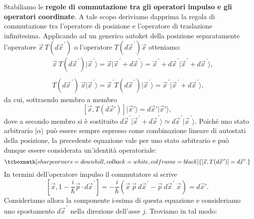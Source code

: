 \documentclass[a4paper,12pt,oneside]{book}
\begin{document}
Stabiliamo le \textbf{regole di commutazione tra gli operatori impulso e gli operatori coordinate}. A tale scopo deriviamo dapprima la regola di commutazione tra l'operatore di posizione e l'operatore di traslazione infinitesima. Applicando ad un generico autoket della posizione separatamente l'operatore $\vec{x}\ T(d{\vec{x}}^{\, \prime})$ o l'operatore $T(d{\vec{x}}^{\, \prime})\vec{x}$ otteniamo:
	\begin{eqnarray}
		& & \vec{x}\ T(d{\vec{x}}^{\, \prime})\vert {\vec{x}}^{\, \prime} \rangle = \vec{x}\vert{\vec{x}}^{\, \prime}+d{\vec{x}}^{\, \prime}\rangle ={\vec{x}}^{\, \prime}+d{\vec{x}}^{\, \prime}\vert{\vec{x}}^{\, \prime}+d{\vec{x}}^{\, \prime}\rangle ,  \\
 \nonumber \\
		& & T(d{\vec{x}}^{\, \prime})\ \vec{x} \vert {\vec{x}}^{\, \prime} \rangle = {\vec{x}}^{\, \prime} T(d{\vec{x}}^{\, \prime})\vert {\vec{x}}^{\, \prime}\rangle = {\vec{x}}^{\, \prime}\vert {\vec{x}}^{\, \prime}+d{\vec{x}}^{\, \prime}\rangle ,
	\end{eqnarray}
da cui, sottraendo membro a membro
	\begin{equation}
		\left[\vec{x}, T(d\vec{x}')\right]\vert \vec{x}' \rangle = d\vec{x}' \vert \vec{x}' \rangle ,
	\end{equation}
dove a secondo membro si è sostituito $d{\vec{x}}^{\, \prime} \vert {\vec{x}}^{\, \prime}+d{\vec{x}}^{\, \prime}\rangle \simeq d{\vec{x}}^{\, \prime} \vert {\vec{x}}^{\, \prime}\rangle$. Poiché uno stato arbitrario $\vert \alpha \rangle $ può essere sempre espresso come combinazione lineare di autostati della posizione, la precedente equazione vale per uno stato arbitrario e può dunque essere considerata un'identità operatoriale:
	\begin{equation}
		\tcboxmath[sharp corners=downhill, colback=white, colframe=black]{	
			\left[\vec{x}, T(d{\vec{x}}^{\, \prime})\right] = d{\vec{x}}^{\, \prime} .
			}
	\end{equation}
In termini dell'operatore impulso il commutatore si scrive
	\begin{equation}
		\left[ \vec{x}, 1- \frac{i}{\hbar}\vec{p}\cdot d{\vec{x}}^{\, \prime}\right] =-\frac{i}{\hbar}\left(\vec{x}\ \vec{p}\ d{\vec{x}}^{\, \prime}-\vec{p}\ d{\vec{x}}^{\, \prime}\ \vec{x} \right) =d\vec{x}' .
	\end{equation}
Consideriamo allora la componente i-esima di questa equazione e consideriamo uno spostamento $d{\vec{x}}^{\, \prime}$ nella direzione dell'asse $j$. Troviamo in tal modo:
\end{document}
